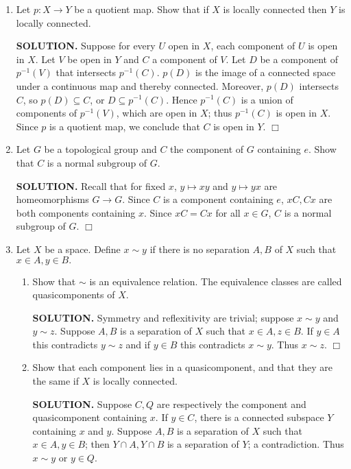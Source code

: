 \documentclass{article}
\begin{document}
\begin{enumerate}
    \item Let $p: X \rightarrow Y$ be a quotient map. Show that if $X$ is locally connected then $Y$ is locally connected.

    {\bf SOLUTION.} Suppose for every $U$ open in $X$, each component of $U$ is open in $X$. Let $V$ be open in $Y$ and $C$ a component of $V$. Let $D$ be a component of $p^{-1}(V)$ that intersects $p^{-1}(C)$. $p(D)$ is the image of a connected space under a continuous map and thereby connected. Moreover, $p(D)$ intersects $C$, so $p(D) \subseteq C$, or $D \subseteq p^{-1}(C)$. Hence $p^{-1}(C)$ is a union of components of $p^{-1}(V)$, which are open in $X$; thus $p^{-1}(C)$ is open in $X$. Since $p$ is a quotient map, we conclude that $C$ is open in $Y$. $\Box$

    \item Let $G$ be a topological group and $C$ the component of $G$ containing $e$. Show that $C$ is a normal subgroup of $G$.

    {\bf SOLUTION.} Recall that for fixed $x$, $y \mapsto xy$ and $y \mapsto yx$ are homeomorphisms $G \rightarrow G$. Since $C$ is a component containing $e$, $xC, Cx$ are both components containing $x$. Since $xC = Cx$ for all $x \in G$, $C$ is a normal subgroup of $G$. $\Box$

    \item Let $X$ be a space. Define $x \sim y$ if there is no separation $A, B$ of $X$ such that $x \in A, y \in B.$
    \begin{enumerate}
        \item Show that $\sim$ is an equivalence relation. The equivalence classes are called quasicomponents of $X$.

        {\bf SOLUTION.} Symmetry and reflexitivity are trivial; suppose $x \sim y$ and $y \sim z$. Suppose $A, B$ is a separation of $X$ such that $x \in A, z \in B$. If $y \in A$ this contradicts $y \sim z$ and if $y \in B$ this contradicts $x \sim y$. Thus $x \sim z$. $\Box$

        \item Show that each component lies in a quasicomponent, and that they are the same if $X$ is locally connected.

        {\bf SOLUTION.} Suppose $C, Q$ are respectively the component and quasicomponent containing $x$. If $y \in C$, there is a connected subspace $Y$ containing $x$ and $y$. Suppose $A, B$ is a separation of $X$ such that $x \in A, y \in B$; then $Y \cap A, Y \cap B$ is a separation of $Y$; a contradiction. Thus $x \sim y$ or $y \in Q$.


\end{enumerate}
\end{enumerate}
\end{document}
